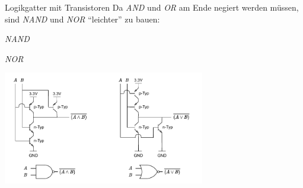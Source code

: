 \begin{bonus}{Logikgatter mit Transistoren}
    Da \emph{AND} und \emph{OR} am Ende negiert werden müssen, sind \emph{NAND} und \emph{NOR} \enquote{leichter} zu bauen:

    \begin{center}
        \begin{minipage}[t]{0.33\textwidth}
            \begin{center}
                \emph{NAND}
            \end{center}
        \end{minipage}
        \begin{minipage}[t]{0.33\textwidth}
            \begin{center}
                \emph{NOR}
            \end{center}
        \end{minipage}

        \includegraphics[width=0.66\textwidth]{includes/figures/bonus_logikgatter.pdf}


\end{center}
\end{bonus}
